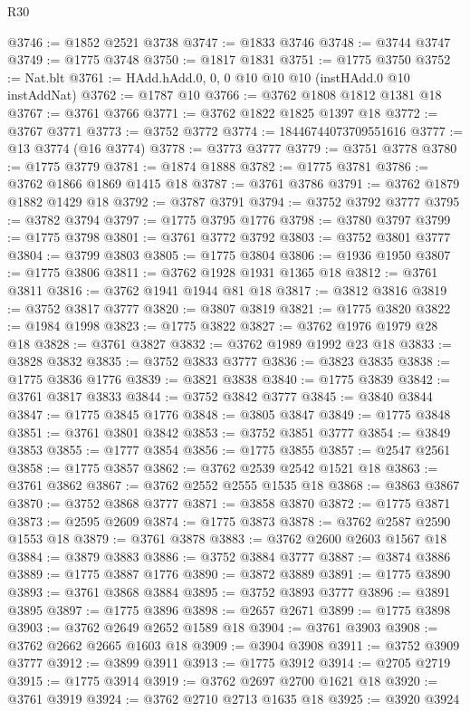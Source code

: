 \begin{lexlean}{R30}
\begin{coremodule}
{{{{{@3746 := @1852 @2521 @3738
@3747 := @1833 @3746
@3748 := @3744 @3747
@3749 := @1775 @3748
@3750 := @1817 @1831
@3751 := @1775 @3750
@3752 := Nat.blt
@3761 := HAdd.hAdd.{0, 0, 0} @10 @10 @10 (instHAdd.{0} @10 instAddNat)
@3762 := @1787 @10
@3766 := @3762 @1808 @1812 @1381 @18
@3767 := @3761 @3766
@3771 := @3762 @1822 @1825 @1397 @18
@3772 := @3767 @3771
@3773 := @3752 @3772
@3774 := 18446744073709551616
@3777 := @13 @3774 (@16 @3774)
@3778 := @3773 @3777
@3779 := @3751 @3778
@3780 := @1775 @3779
@3781 := @1874 @1888
@3782 := @1775 @3781
@3786 := @3762 @1866 @1869 @1415 @18
@3787 := @3761 @3786
@3791 := @3762 @1879 @1882 @1429 @18
@3792 := @3787 @3791
@3794 := @3752 @3792 @3777
@3795 := @3782 @3794
@3797 := @1775 @3795 @1776
@3798 := @3780 @3797
@3799 := @1775 @3798
@3801 := @3761 @3772 @3792
@3803 := @3752 @3801 @3777
@3804 := @3799 @3803
@3805 := @1775 @3804
@3806 := @1936 @1950
@3807 := @1775 @3806
@3811 := @3762 @1928 @1931 @1365 @18
@3812 := @3761 @3811
@3816 := @3762 @1941 @1944 @81 @18
@3817 := @3812 @3816
@3819 := @3752 @3817 @3777
@3820 := @3807 @3819
@3821 := @1775 @3820
@3822 := @1984 @1998
@3823 := @1775 @3822
@3827 := @3762 @1976 @1979 @28 @18
@3828 := @3761 @3827
@3832 := @3762 @1989 @1992 @23 @18
@3833 := @3828 @3832
@3835 := @3752 @3833 @3777
@3836 := @3823 @3835
@3838 := @1775 @3836 @1776
@3839 := @3821 @3838
@3840 := @1775 @3839
@3842 := @3761 @3817 @3833
@3844 := @3752 @3842 @3777
@3845 := @3840 @3844
@3847 := @1775 @3845 @1776
@3848 := @3805 @3847
@3849 := @1775 @3848
@3851 := @3761 @3801 @3842
@3853 := @3752 @3851 @3777
@3854 := @3849 @3853
@3855 := @1777 @3854
@3856 := @1775 @3855
@3857 := @2547 @2561
@3858 := @1775 @3857
@3862 := @3762 @2539 @2542 @1521 @18
@3863 := @3761 @3862
@3867 := @3762 @2552 @2555 @1535 @18
@3868 := @3863 @3867
@3870 := @3752 @3868 @3777
@3871 := @3858 @3870
@3872 := @1775 @3871
@3873 := @2595 @2609
@3874 := @1775 @3873
@3878 := @3762 @2587 @2590 @1553 @18
@3879 := @3761 @3878
@3883 := @3762 @2600 @2603 @1567 @18
@3884 := @3879 @3883
@3886 := @3752 @3884 @3777
@3887 := @3874 @3886
@3889 := @1775 @3887 @1776
@3890 := @3872 @3889
@3891 := @1775 @3890
@3893 := @3761 @3868 @3884
@3895 := @3752 @3893 @3777
@3896 := @3891 @3895
@3897 := @1775 @3896
@3898 := @2657 @2671
@3899 := @1775 @3898
@3903 := @3762 @2649 @2652 @1589 @18
@3904 := @3761 @3903
@3908 := @3762 @2662 @2665 @1603 @18
@3909 := @3904 @3908
@3911 := @3752 @3909 @3777
@3912 := @3899 @3911
@3913 := @1775 @3912
@3914 := @2705 @2719
@3915 := @1775 @3914
@3919 := @3762 @2697 @2700 @1621 @18
@3920 := @3761 @3919
@3924 := @3762 @2710 @2713 @1635 @18
@3925 := @3920 @3924
}}}}}
\end{coremodule}
\end{lexlean}
